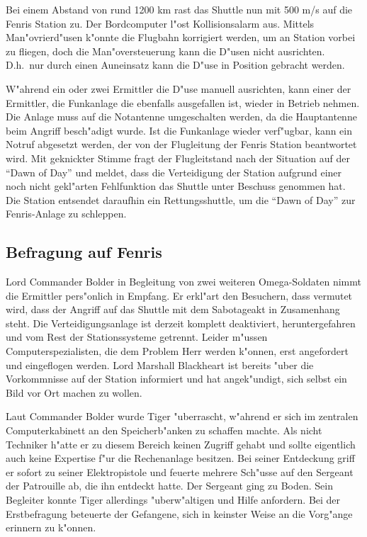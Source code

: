 Bei einem Abstand von rund 1200 km rast das Shuttle nun mit 500 m/s auf die Fenris Station zu. Der Bordcomputer l"ost Kollisionsalarm aus. Mittels Man"ovrierd"usen k"onnte die Flugbahn korrigiert werden, um an Station vorbei zu fliegen, doch die Man"oversteuerung kann die D"usen nicht ausrichten. D.h.~nur durch einen Au\3neinsatz kann die D"use in Position gebracht werden.

W"ahrend ein oder zwei Ermittler die D"use manuell ausrichten, kann einer der Ermittler, die Funkanlage die ebenfalls ausgefallen ist, wieder in Betrieb nehmen. Die Anlage muss auf die Notantenne umgeschalten werden, da die Hauptantenne beim Angriff besch"adigt wurde. Ist die Funkanlage wieder verf"ugbar, kann ein Notruf abgesetzt werden, der von der Flugleitung der Fenris Station beantwortet wird. Mit geknickter Stimme fragt der Flugleitstand nach der Situation auf der "`Dawn of Day"' und meldet, dass die Verteidigung der Station aufgrund einer noch nicht gekl"arten Fehlfunktion das Shuttle unter Beschuss genommen hat. Die Station entsendet daraufhin ein Rettungsshuttle, um die "`Dawn of Day"' zur Fenris-Anlage zu schleppen.

\subsection{Befragung auf Fenris}

Lord Commander Bolder in Begleitung von zwei weiteren Omega-Soldaten nimmt die Ermittler pers"onlich in Empfang. Er erkl"art den Besuchern, dass vermutet wird, dass der Angriff auf das Shuttle mit dem Sabotageakt in Zusamenhang steht. Die Verteidigungsanlage ist derzeit komplett deaktiviert, heruntergefahren und vom Rest der Stationssysteme getrennt. Leider m"ussen Computerspezialisten, die dem Problem Herr werden k"onnen, erst angefordert und eingeflogen werden. Lord Marshall Blackheart ist bereits "uber die Vorkommnisse auf der Station informiert und hat angek"undigt, sich selbst ein Bild vor Ort machen zu wollen.

Laut Commander Bolder wurde Tiger "uberrascht, w"ahrend er sich im zentralen Computerkabinett an den Speicherb"anken zu schaffen machte. Als nicht Techniker h"atte er zu diesem Bereich keinen Zugriff gehabt und sollte eigentlich auch  keine Expertise f"ur die Rechenanlage besitzen. Bei seiner Entdeckung griff er sofort zu seiner Elektropistole und feuerte mehrere Sch"usse auf den Sergeant der Patrouille ab, die ihn entdeckt hatte. Der Sergeant ging zu Boden. Sein Begleiter konnte Tiger allerdings "uberw"altigen und Hilfe anfordern. Bei der Erstbefragung beteuerte der Gefangene, sich in keinster Weise an die Vorg"ange erinnern zu k"onnen.

